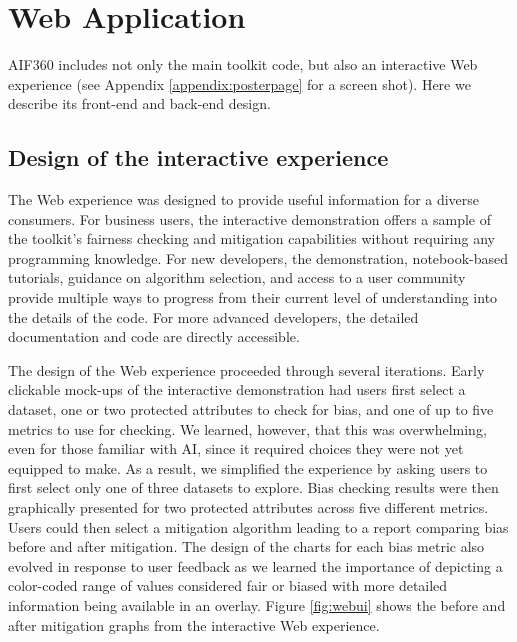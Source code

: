 \documentclass{article}
\begin{document}

\section{Web Application}
\label{sec:webapp}

AIF360 includes not only the main toolkit code, but also an interactive Web experience (see Appendix \ref{appendix:posterpage} for a screen shot). Here we describe its front-end and back-end design.


\subsection{Design of the interactive experience}

The Web experience was designed to provide useful information for a diverse consumers. For business users, the interactive demonstration offers a sample of the toolkit's fairness checking and mitigation capabilities without requiring any programming knowledge. For new developers, the demonstration, notebook-based tutorials, guidance on algorithm selection, and access to a user community provide multiple ways to progress from their current level of understanding into the details of the code. For more advanced developers, the detailed documentation and code are directly accessible.

The design of the Web experience proceeded through several iterations. Early clickable mock-ups of the interactive demonstration had users first select a dataset, one or two protected attributes to check for bias, and one of up to five metrics to use for checking. We learned, however, that this was overwhelming, even for those familiar with AI, since it required choices they were not yet equipped to make. As a result, we simplified the experience by asking users to first select only one of three datasets to explore. Bias checking results were then graphically presented for two protected attributes across five different metrics. Users could then select a mitigation algorithm leading to a report comparing bias before and after mitigation. The design of the charts for each bias metric also evolved in response to user feedback as we learned the importance of depicting a color-coded range of values considered fair or biased with more detailed information being available in an overlay. Figure \ref{fig:webui} shows the before and after mitigation graphs from the interactive Web experience. 
\end{document}
